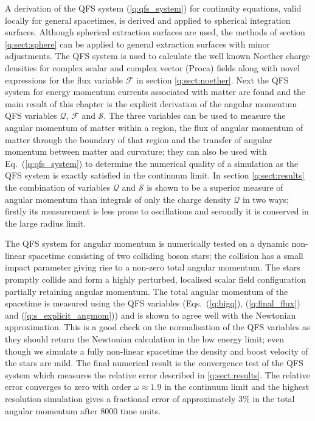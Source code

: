 A derivation of the QFS system (\ref{q:qfs_system}) for continuity equations, valid locally for general spacetimes, is derived and applied to spherical integration surfaces. Although spherical extraction surfaces are used, the methods of section \ref{q:sect:sphere} can be applied to general extraction surfaces with minor adjustments. The QFS system is used to calculate the well known Noether charge densities for complex scalar and complex vector (Proca) fields along with novel expressions for the flux variable $\mathcal{F}$ in section \ref{q:sect:noether}. Next the QFS system for energy momentum currents associated with matter are found and the main result of this chapter is the explicit derivation of the angular momentum QFS variables $\mathcal{Q}$,  $\mathcal{F}$ and $\mathcal{S}$. The three variables can be used to measure the angular momentum of matter within a region, the flux of angular momentum of matter through the boundary of that region and the transfer of angular momentum between matter and curvature; they can also be used with Eq.~(\ref{q:qfs_system}) to determine the numerical quality of a simulation as the QFS system is exactly satisfied in the continuum limit. In section \ref{q:sect:results} the combination of variables $\mathcal{Q}$ and $\mathcal{S}$ is shown to be a superior measure of angular momentum than integrals of only the charge density $\mathcal{Q}$ in two ways; firstly its measurement is less prone to oscillations and secondly it is conserved in the large radius limit.

The QFS system for angular momentum is numerically tested on a dynamic non-linear spacetime consisting of two colliding boson stars; the collision has a small impact parameter giving rise to a non-zero total angular momentum. The stars promptly collide and form a highly perturbed, localised scalar field configuration partially retaining angular momentum. The total angular momentum of the spacetime is measured using the QFS variables (Eqs.~(\ref{q:bigq}), (\ref{q:final_flux}) and (\ref{q:s_explicit_angmom})) and is shown to agree well with the Newtonian approximation. This is a good check on the normalisation of the QFS variables as they should return the Newtonian calculation in the low energy limit; even though we simulate a fully non-linear spacetime the density and boost velocity of the stars are mild. The final numerical result is the convergence test of the QFS system which measures the relative error described in \ref{q:sect:results}. The relative error converges to zero with order $\omega\approx 1.9$ in the continuum limit and the highest resolution simulation gives a fractional error of approximately $3 \%$ in the total angular momentum after $8000$ time units.

